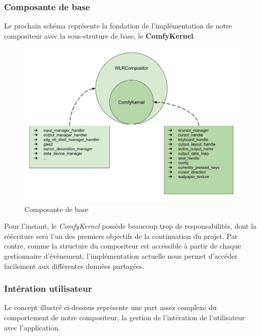 \documentclass[titlepage]{article}
\begin{document}
\subsubsection{Composante de base}
\par
Le prochain schéma représente la fondation de l'implémentation de notre
compositeur avec la sous-struture de base, le \textbf{ComfyKernel}.
\bigskip

\begin{figure}[H]
	\centering
	\includegraphics[width=\textwidth]{architecture_base.jpg}
	\caption{Composante de base}
\end{figure}

\par
Pour l'instant, le \textit{ComfyKernel} possède beaucoup trop de
responsabilités, dont la réécriture sera l'un des premiers objectifs de la
continuation du projet. Par contre, comme la structure du compositeur est
accessible à partir de chaque gestionnaire d'évènement, l'implémentation
actuelle nous permet d'accéder facilement aux différentes données partagées.
\bigskip

\subsubsection{Intération utilisateur}
\par
Le concept illustré ci-dessous représente une part assez complexe du comportement
de notre compositeur, la gestion de l'intération de l'utilisateur avec
l'application.
\bigskip
\end{document}
